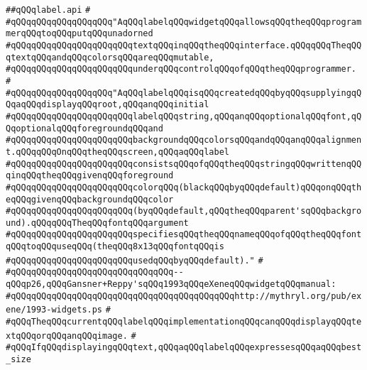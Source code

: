 \label{src/lib/x-kit/widget/old/leaf/label.api}
\verb|##qQQqlabel.api|\newline
\verb|#|\newline
\verb|#qQQqqQQqqQQqqQQqqQQq"AqQQqlabelqQQqwidgetqQQqallowsqQQqtheqQQqprogrammerqQQqtoqQQqputqQQqunadorned|\newline
\verb|#qQQqqQQqqQQqqQQqqQQqqQQqtextqQQqinqQQqtheqQQqinterface.qQQqqQQqTheqQQqtextqQQqandqQQqcolorsqQQqareqQQqmutable,|\newline
\verb|#qQQqqQQqqQQqqQQqqQQqqQQqunderqQQqcontrolqQQqofqQQqtheqQQqprogrammer.|\newline
\verb|#|\newline
\verb|#qQQqqQQqqQQqqQQqqQQq"AqQQqlabelqQQqisqQQqcreatedqQQqbyqQQqsupplyingqQQqaqQQqdisplayqQQqroot,qQQqanqQQqinitial|\newline
\verb|#qQQqqQQqqQQqqQQqqQQqqQQqlabelqQQqstring,qQQqanqQQqoptionalqQQqfont,qQQqoptionalqQQqforegroundqQQqand|\newline
\verb|#qQQqqQQqqQQqqQQqqQQqqQQqbackgroundqQQqcolorsqQQqandqQQqanqQQqalignment.qQQqqQQqOnqQQqtheqQQqscreen,qQQqaqQQqlabel|\newline
\verb|#qQQqqQQqqQQqqQQqqQQqqQQqconsistsqQQqofqQQqtheqQQqstringqQQqwrittenqQQqinqQQqtheqQQqgivenqQQqforeground|\newline
\verb|#qQQqqQQqqQQqqQQqqQQqqQQqcolorqQQq(blackqQQqbyqQQqdefault)qQQqonqQQqtheqQQqgivenqQQqbackgroundqQQqcolor|\newline
\verb|#qQQqqQQqqQQqqQQqqQQqqQQq(byqQQqdefault,qQQqtheqQQqparent'sqQQqbackground).qQQqqQQqTheqQQqfontqQQqargument|\newline
\verb|#qQQqqQQqqQQqqQQqqQQqqQQqspecifiesqQQqtheqQQqnameqQQqofqQQqtheqQQqfontqQQqtoqQQquseqQQq(theqQQq8x13qQQqfontqQQqis|\newline
\verb|#qQQqqQQqqQQqqQQqqQQqqQQqusedqQQqbyqQQqdefault)."|\newline
\verb|#|\newline
\verb|#qQQqqQQqqQQqqQQqqQQqqQQqqQQqqQQq--qQQqp26,qQQqGansner+Reppy'sqQQq1993qQQqeXeneqQQqwidgetqQQqmanual:|\newline
\verb|#qQQqqQQqqQQqqQQqqQQqqQQqqQQqqQQqqQQqqQQqqQQqhttp://mythryl.org/pub/exene/1993-widgets.ps|\newline
\verb|#|\newline
\verb|#qQQqTheqQQqcurrentqQQqlabelqQQqimplementationqQQqcanqQQqdisplayqQQqtextqQQqorqQQqanqQQqimage.|\newline
\verb|#|\newline
\verb|#qQQqIfqQQqdisplayingqQQqtext,qQQqaqQQqlabelqQQqexpressesqQQqaqQQqbest_size|\newline
